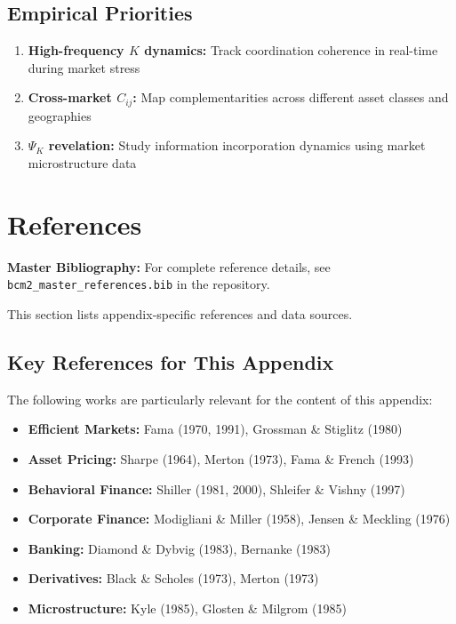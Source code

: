 \subsection{Empirical Priorities}

\begin{enumerate}
    \item \textbf{High-frequency $K$ dynamics:} Track coordination coherence
        in real-time during market stress
    \item \textbf{Cross-market $C_{ij}$:} Map complementarities across
        different asset classes and geographies
    \item \textbf{$\Psi_K$ revelation:} Study information incorporation
        dynamics using market microstructure data
\end{enumerate}


\section{References}
\label{sec:Y-references}

\begin{tcolorbox}[colback=blue!5!white, colframe=blue!75!black]
\textbf{Master Bibliography:} For complete reference details, see
\texttt{bcm2\_master\_references.bib} in the repository.

This section lists appendix-specific references and data sources.
\end{tcolorbox}

\vspace{0.5em}

\subsection{Key References for This Appendix}

The following works are particularly relevant for the content of this appendix:

\begin{itemize}[nosep]
    \item \textbf{Efficient Markets:} Fama (1970, 1991), Grossman \& Stiglitz (1980)
    \item \textbf{Asset Pricing:} Sharpe (1964), Merton (1973), Fama \& French (1993)
    \item \textbf{Behavioral Finance:} Shiller (1981, 2000), Shleifer \& Vishny (1997)
    \item \textbf{Corporate Finance:} Modigliani \& Miller (1958), Jensen \& Meckling (1976)
    \item \textbf{Banking:} Diamond \& Dybvig (1983), Bernanke (1983)
    \item \textbf{Derivatives:} Black \& Scholes (1973), Merton (1973)
    \item \textbf{Microstructure:} Kyle (1985), Glosten \& Milgrom (1985)
\end{itemize}

